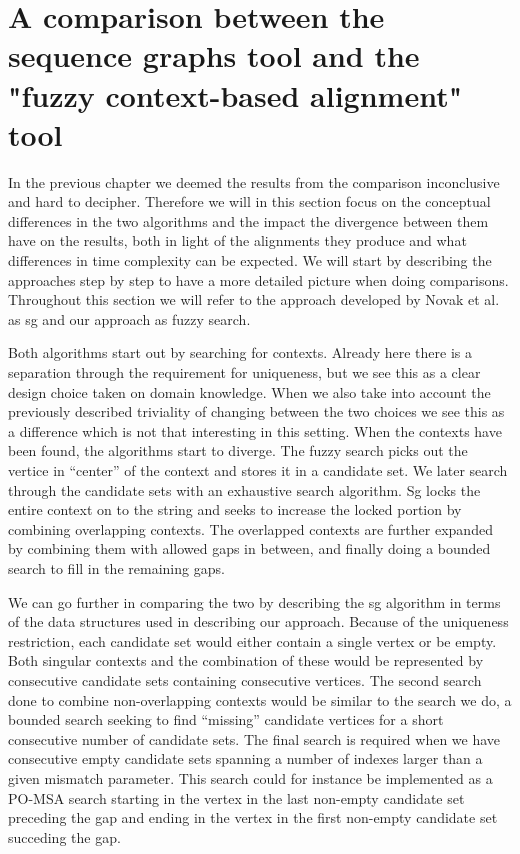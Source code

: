 \documentclass[thesis.tex]{subfiles}
\begin{document}
\section{A comparison between the sequence graphs tool and the "fuzzy context-based alignment" tool}
\label{sec:conceptual_comparison}
In the previous chapter we deemed the results from the comparison inconclusive and hard to decipher. Therefore we will in this section focus on the conceptual differences in the two algorithms and the impact the divergence between them have on the results, both in light of the alignments they produce and what differences in time complexity can be expected. We will start by describing the approaches step by step to have a more detailed picture when doing comparisons. Throughout this section we will refer to the approach developed by Novak et al. as sg and our approach as fuzzy search.\\
\par\noindent
Both algorithms start out by searching for contexts. Already here there is a separation through the requirement for uniqueness, but we see this as a clear design choice taken on domain knowledge. When we also take into account the previously described triviality of changing between the two choices we see this as a difference which is not that interesting in this setting. When the contexts have been found, the algorithms start to diverge. The fuzzy search picks out the vertice in ``center'' of the context and stores it in a candidate set. We later search through the candidate sets with an exhaustive search algorithm. Sg locks the entire context on to the string and seeks to increase the locked portion by combining overlapping contexts. The overlapped contexts are further expanded by combining them with allowed gaps in between, and finally doing a bounded search to fill in the remaining gaps.\\
\par\noindent
We can go further in comparing the two by describing the sg algorithm in terms of the data structures used in describing our approach. Because of the uniqueness restriction, each candidate set would either contain a single vertex or be empty. Both singular contexts and the combination of these would be represented by consecutive candidate sets containing consecutive vertices. The second search done to combine non-overlapping contexts would be similar to the search we do, a bounded search seeking to find ``missing'' candidate vertices for a short consecutive number of candidate sets. The final search is required when we have consecutive empty candidate sets spanning a number of indexes larger than a given mismatch parameter. This search could for instance be implemented as a PO-MSA search starting in the vertex in the last non-empty candidate set preceding the gap and ending in the vertex in the first non-empty candidate set succeding the gap.\\
\end{document}
